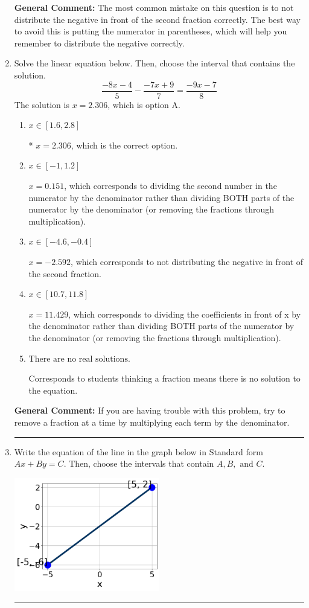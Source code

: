 \documentclass{extbook}[14pt]
\newcommand{\litem}[1]{\item #1

\rule{\textwidth}{0.4pt}}
\begin{document}
\begin{enumerate}
{\textbf{General Comment:} The most common mistake on this question is to not distribute the negative in front of the second fraction correctly. The best way to avoid this is putting the numerator in parentheses, which will help you remember to distribute the negative correctly.
}
\litem{
Solve the linear equation below. Then, choose the interval that contains the solution.
\[ \frac{-8x -4}{5} - \frac{-7x + 9}{7} = \frac{-9x -7}{8} \]
The solution is \( x = 2.306 \), which is option A.\begin{enumerate}[label=\Alph*.]
\item \( x \in [1.6, 2.8] \)

* $x = 2.306$, which is the correct option.
\item \( x \in [-1, 1.2] \)

 $x = 0.151$, which corresponds to dividing the second number in the numerator by the denominator rather than dividing BOTH parts of the numerator by the denominator (or removing the fractions through multiplication).
\item \( x \in [-4.6, -0.4] \)

 $x = -2.592$, which corresponds to not distributing the negative in front of the second fraction.
\item \( x \in [10.7, 11.8] \)

 $x = 11.429$, which corresponds to dividing the coefficients in front of x by the denominator rather than dividing BOTH parts of the numerator by the denominator (or removing the fractions through multiplication).
\item \( \text{There are no real solutions.} \)

Corresponds to students thinking a fraction means there is no solution to the equation.
\end{enumerate}

\textbf{General Comment:} If you are having trouble with this problem, try to remove a fraction at a time by multiplying each term by the denominator.
}
\litem{
Write the equation of the line in the graph below in Standard form $Ax+By=C$. Then, choose the intervals that contain $A, B, \text{ and } C$.

\begin{center}
    \includegraphics[width=0.5\textwidth]{../Figures/linearGraphToStandardCopyB.png}
\end{center}



}
\end{enumerate}
\end{document}
